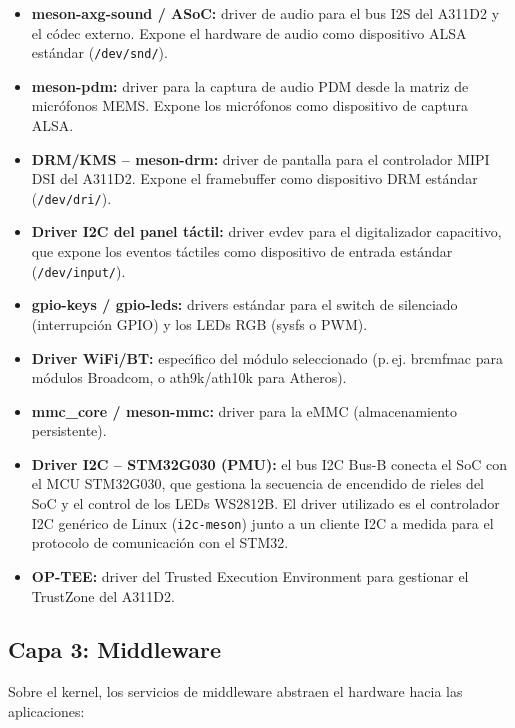 \begin{itemize}
  \item \textbf{meson-axg-sound / ASoC:} driver de audio para el bus I2S del A311D2
    y el c\'{o}dec externo. Expone el hardware de audio como dispositivo ALSA
    est\'{a}ndar (\texttt{/dev/snd/}).
  \item \textbf{meson-pdm:} driver para la captura de audio PDM desde la matriz
    de micr\'{o}fonos MEMS. Expone los micr\'{o}fonos como dispositivo de captura
    ALSA.
  \item \textbf{DRM/KMS -- meson-drm:} driver de pantalla para el controlador
    MIPI DSI del A311D2. Expone el framebuffer como dispositivo DRM est\'{a}ndar
    (\texttt{/dev/dri/}).
  \item \textbf{Driver I2C del panel t\'{a}ctil:} driver evdev para el
    digitalizador capacitivo, que expone los eventos t\'{a}ctiles como dispositivo
    de entrada est\'{a}ndar (\texttt{/dev/input/}).
  \item \textbf{gpio-keys / gpio-leds:} drivers est\'{a}ndar para el switch de
    silenciado (interrupci\'{o}n GPIO) y los LEDs RGB (sysfs o PWM).
  \item \textbf{Driver WiFi/BT:} espec\'{\i}fico del m\'{o}dulo seleccionado
    (p.\,ej. brcmfmac para m\'{o}dulos Broadcom, o ath9k/ath10k para Atheros).
  \item \textbf{mmc\_core / meson-mmc:} driver para la eMMC (almacenamiento
    persistente).
  \item \textbf{Driver I2C -- STM32G030 (PMU):} el bus I2C Bus-B conecta el SoC
    con el MCU STM32G030, que gestiona la secuencia de encendido de rieles del SoC
    y el control de los LEDs WS2812B. El driver utilizado es el controlador I2C
    gen\'{e}rico de Linux (\texttt{i2c-meson}) junto a un cliente I2C a medida
    para el protocolo de comunicaci\'{o}n con el STM32.
  \item \textbf{OP-TEE:} driver del Trusted Execution Environment para gestionar
    el TrustZone del A311D2.
\end{itemize}

\subsection{Capa 3: Middleware}

Sobre el kernel, los servicios de middleware abstraen el hardware hacia las
aplicaciones:


